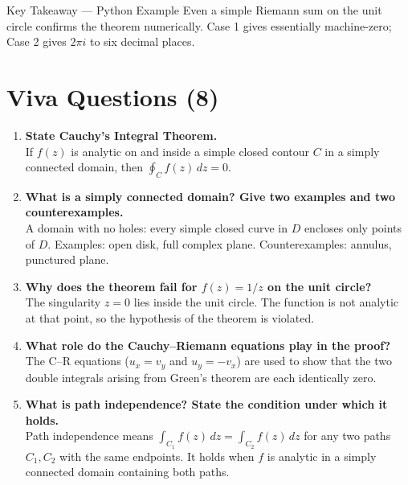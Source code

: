 \documentclass[12pt,a4paper]{article}
\begin{document}
\begin{learnbox}{Key Takeaway --- Python Example}
Even a simple Riemann sum on the unit circle confirms the theorem numerically.
Case 1 gives essentially machine-zero; Case 2 gives $2\pi i$ to six decimal places.
\end{learnbox}

\section{Viva Questions (8)}

\begin{enumerate}
  \item \textbf{State Cauchy's Integral Theorem.}\\
        If $f(z)$ is analytic on and inside a simple closed contour $C$ in a simply connected
        domain, then $\oint_{C} f(z)\,dz = 0$.

  \item \textbf{What is a simply connected domain? Give two examples and two counterexamples.}\\
        A domain with no holes: every simple closed curve in $D$ encloses only points of $D$.
        Examples: open disk, full complex plane.
        Counterexamples: annulus, punctured plane.

  \item \textbf{Why does the theorem fail for $f(z) = 1/z$ on the unit circle?}\\
        The singularity $z=0$ lies inside the unit circle.
        The function is not analytic at that point, so the hypothesis of the theorem is violated.

  \item \textbf{What role do the Cauchy--Riemann equations play in the proof?}\\
        The C--R equations ($u_x = v_y$ and $u_y = -v_x$) are used to show that the two
        double integrals arising from Green's theorem are each identically zero.

  \item \textbf{What is path independence? State the condition under which it holds.}\\
        Path independence means $\int_{C_1}f(z)\,dz = \int_{C_2}f(z)\,dz$ for any two paths
        $C_1, C_2$ with the same endpoints.
        It holds when $f$ is analytic in a simply connected domain containing both paths.


\end{enumerate}
\end{document}
